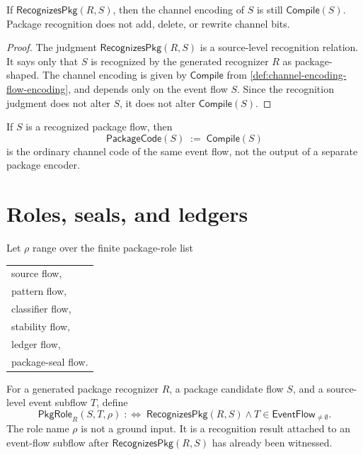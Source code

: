 \begin{proposition}
\label{prop:package-generated-recognition-preserves-code}
If $\mathsf{RecognizesPkg}(R,S)$, then the channel encoding of $S$ is still $\mathsf{Compile}(S)$. Package recognition does not add, delete, or rewrite channel bits.
\end{proposition}

\begin{proof}
The judgment $\mathsf{RecognizesPkg}(R,S)$ is a source-level recognition relation. It says only that $S$ is recognized by the generated recognizer $R$ as package-shaped. The channel encoding is given by $\mathsf{Compile}$ from \autoref{def:channel-encoding-flow-encoding}, and depends only on the event flow $S$. Since the recognition judgment does not alter $S$, it does not alter $\mathsf{Compile}(S)$.
\end{proof}

\begin{corollary}
\label{cor:package-generated-code-not-separate}
If $S$ is a recognized package flow, then
$$
  \mathsf{PackageCode}(S) \;:=\; \mathsf{Compile}(S)
$$
is the ordinary channel code of the same event flow, not the output of a separate package encoder.
\end{corollary}

\section{Roles, seals, and ledgers}
\label{sec:package-generated-roles-seals-ledgers}

\begin{definition}
\label{def:package-generated-role-emergence}
Let $\rho$ range over the finite package-role list
\begin{center}
\begin{tabular}{l}
  source flow, \\
  pattern flow, \\
  classifier flow, \\
  stability flow, \\
  ledger flow, \\
  package-seal flow.
\end{tabular}
\end{center}
For a generated package recognizer $R$, a package candidate flow $S$, and a source-level event subflow $T$, define
$$
  \mathsf{PkgRole}_{R}(S,T,\rho)
  \;:\Longleftrightarrow\;
  \mathsf{RecognizesPkg}(R,S)
  \wedge
  T\in\mathsf{EventFlow}_{\ne\emptyset}.
$$
The role name $\rho$ is not a ground input. It is a recognition result attached to an event-flow subflow after $\mathsf{RecognizesPkg}(R,S)$ has already been witnessed.
\end{definition}

